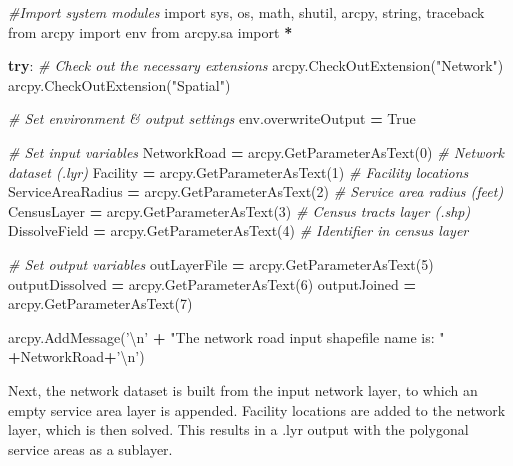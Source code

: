 \documentclass[11pt,]{article}
\newenvironment{Shaded}{\begin{snugshade}}{\end{snugshade}}
\newcommand{\DecValTok}[1]{\textcolor[rgb]{0.00,0.00,0.81}{{#1}}}
\newcommand{\CharTok}[1]{\textcolor[rgb]{0.31,0.60,0.02}{{#1}}}
\newcommand{\StringTok}[1]{\textcolor[rgb]{0.31,0.60,0.02}{{#1}}}
\newcommand{\ImportTok}[1]{{#1}}
\newcommand{\CommentTok}[1]{\textcolor[rgb]{0.56,0.35,0.01}{\textit{{#1}}}}
\newcommand{\VariableTok}[1]{\textcolor[rgb]{0.00,0.00,0.00}{{#1}}}
\newcommand{\ControlFlowTok}[1]{\textcolor[rgb]{0.13,0.29,0.53}{\textbf{{#1}}}}
\newcommand{\OperatorTok}[1]{\textcolor[rgb]{0.81,0.36,0.00}{\textbf{{#1}}}}
\newcommand{\NormalTok}[1]{{#1}}
\begin{document}
\begin{Shaded}
\begin{Highlighting}[]
\CommentTok{#Import system modules}
\ImportTok{import} \NormalTok{sys, os, math, shutil, arcpy, string, traceback}
\ImportTok{from} \NormalTok{arcpy }\ImportTok{import} \NormalTok{env}
\ImportTok{from} \NormalTok{arcpy.sa }\ImportTok{import} \OperatorTok{*}


\ControlFlowTok{try}\NormalTok{:}
    \CommentTok{# Check out the necessary extensions}
    \NormalTok{arcpy.CheckOutExtension(}\StringTok{"Network"}\NormalTok{)}
    \NormalTok{arcpy.CheckOutExtension(}\StringTok{"Spatial"}\NormalTok{)}

    \CommentTok{# Set environment & output settings}
    \NormalTok{env.overwriteOutput }\OperatorTok{=} \VariableTok{True}

    \CommentTok{# Set input variables}
    \NormalTok{NetworkRoad }\OperatorTok{=} \NormalTok{arcpy.GetParameterAsText(}\DecValTok{0}\NormalTok{)        }\CommentTok{# Network dataset (.lyr)}
    \NormalTok{Facility }\OperatorTok{=} \NormalTok{arcpy.GetParameterAsText(}\DecValTok{1}\NormalTok{)           }\CommentTok{# Facility locations}
    \NormalTok{ServiceAreaRadius }\OperatorTok{=} \NormalTok{arcpy.GetParameterAsText(}\DecValTok{2}\NormalTok{)  }\CommentTok{# Service area radius (feet)}
    \NormalTok{CensusLayer }\OperatorTok{=} \NormalTok{arcpy.GetParameterAsText(}\DecValTok{3}\NormalTok{)        }\CommentTok{# Census tracts layer (.shp)}
    \NormalTok{DissolveField }\OperatorTok{=} \NormalTok{arcpy.GetParameterAsText(}\DecValTok{4}\NormalTok{)      }\CommentTok{# Identifier in census layer}

    \CommentTok{# Set output variables}
    \NormalTok{outLayerFile }\OperatorTok{=} \NormalTok{arcpy.GetParameterAsText(}\DecValTok{5}\NormalTok{)}
    \NormalTok{outputDissolved }\OperatorTok{=} \NormalTok{arcpy.GetParameterAsText(}\DecValTok{6}\NormalTok{)}
    \NormalTok{outputJoined }\OperatorTok{=} \NormalTok{arcpy.GetParameterAsText(}\DecValTok{7}\NormalTok{)}
    
    \NormalTok{arcpy.AddMessage(}\StringTok{'}\CharTok{\textbackslash{}n}\StringTok{'} \OperatorTok{+} \StringTok{"The network road input shapefile name is: "}
      \OperatorTok{+}\NormalTok{NetworkRoad}\OperatorTok{+}\StringTok{'}\CharTok{\textbackslash{}n}\StringTok{'}\NormalTok{)}
\end{Highlighting}
\end{Shaded}

\noindent Next, the network dataset is built from the input network
layer, to which an empty service area layer is appended. Facility
locations are added to the network layer, which is then solved. This
results in a .lyr output with the polygonal service areas as a sublayer.
\end{document}
